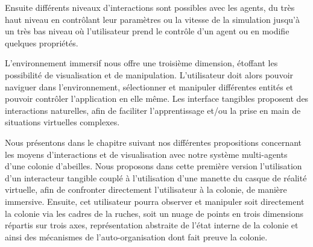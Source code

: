 		Ensuite différents niveaux d'interactions sont possibles avec les agents, du très haut niveau en contrôlant leur paramètres ou la vitesse de la simulation jusqu'à un très bas niveau où l'utilisateur prend le contrôle d'un agent ou en modifie quelques propriétés.
		
		L'environnement immersif nous offre une troisième dimension, étoffant les possibilité de visualisation et de manipulation. L'utilisateur doit alors pouvoir naviguer dans l'environnement, sélectionner et manipuler différentes entités et pouvoir contrôler l'application en elle même. Les interface tangibles proposent des interactions naturelles, afin de faciliter l'apprentissage et/ou la prise en main de situations virtuelles complexes.
		
		Nous présentons dans le chapitre suivant nos différentes propositions concernant les moyens d'interactions et de visualisation avec notre système multi-agents d'une colonie d'abeilles. Nous proposons dans cette première version l'utilisation d'un interacteur tangible couplé à l'utilisation d'une manette du casque de réalité virtuelle, afin de confronter directement l'utilisateur à la colonie, de manière immersive. Ensuite, cet utilisateur pourra observer et manipuler soit directement la colonie via les cadres de la ruches, soit un nuage de points en trois dimensions répartis sur trois axes, représentation abstraite de l'état interne de la colonie et ainsi des mécanismes de l'auto-organisation dont fait preuve la colonie.
